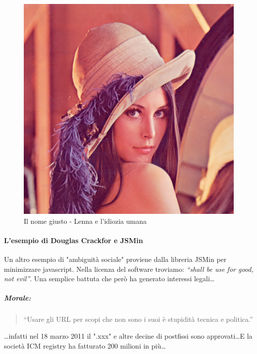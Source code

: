 				\begin{figure} [h]
					\centering
					\includegraphics[scale=0.25]{images/IlNomeGiusto-IdioziaUmana}
					\caption{Il nome giusto - Lenna e l'idiozia umana}
					\label{fig:IlNomeGiusto-IdioziaUmana}
				\end{figure}
			
			\paragraph{L'esempio di Douglas Crackfor e JSMin}
				Un altro esempio di "ambiguità sociale" proviene dalla libreria JSMin per minimizzare javascript. Nella licenza del software troviamo: \emph{``shall be use for good, not evil''}. Una semplice battuta che però ha generato interessi legali\dots
			
			\subparagraph*{Morale:}
			\begin{quote}
				``Usare gli URL per scopi che non sono i suoi è stupidità tecnica e politica.''
			\end{quote}
			\dots infatti nel 18 marzo 2011 il ".xxx" e altre decine di postfissi sono approvati\dots E la società ICM registry ha fatturato 200 milioni in più\dots